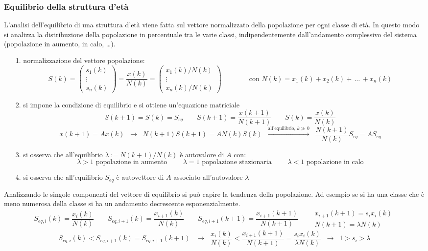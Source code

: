 \subsubsection*{Equilibrio della struttura d'età}
L'analisi dell'equilibrio di una struttura d'età viene fatta sul vettore normalizzato della popolazione per ogni classe di età. In
questo modo si analizza la distribuzione della popolazione in percentuale tra le varie classi, indipendentemente dall'andamento
complessivo del sistema (popolazione in aumento, in calo, \dots).
\begin{itemize}
	\item[1.] normalizzazione del vettore popolazione:
	\[S(k) = \left(\begin{matrix}
		s_1(k) \\ \vdots \\ s_n(k)
	\end{matrix}\right) = \frac{x(k)}{N(k)} = \left(\begin{matrix}
		x_1(k)/N(k) \\ \vdots \\ x_n(k)/N(k)
	\end{matrix}\right) \qquad\qquad \text{con } N(k) = x_1(k) + x_2(k) + \!\,\dots\!\, + x_n(k)\]
	\item[2.] si impone la condizione di equilibrio e si ottiene un'equazione matriciale
	\[S(k+1) = S(k) = S_{eq} \qquad S(k+1) = \frac{x(k+1)}{N(k+1)} \qquad S(k) = \frac{x(k)}{N(k)}\]
	\[x(k+1) = Ax(k) \;\; \rightarrow \;\; N(k+1)S(k+1) = A N(k)S(k) \;\; \stackrel{\text{all'equilibrio, } k \gg 0}{\longrightarrow} \;\; \frac{N(k+1)}{N(k)} S_{eq} = A S_{eq}\]
	\item[3.] si osserva che all'equilibrio \(\lambda := N(k+1)/N(k)\) è autovalore di \(A\) con:
	\[\lambda > 1 \text{ popolazione in aumento } \qquad \lambda = 1 \text{ popolazione stazionaria } \qquad \lambda < 1 \text{ popolazione in calo}\]
	\item[4.] si osserva che all'equilibrio \(S_{eq}\) è autovettore di \(A\) associato all'autovalore \(\lambda\)
\end{itemize}
Analizzando le singole componenti del vettore di equilibrio si può capire la tendenza della popolazione. Ad esempio se si ha una
classe  che è meno numerosa della classe  si ha un andamento decrescente esponenzialmente.
\[S_{eq,i}(k) = \frac{x_i(k)}{N(k)} \qquad S_{eq,i+1}(k) = \frac{x_{i+1}(k)}{N(k)} \qquad S_{eq,i+1}(k+1) = \frac{x_{i+1}(k+1)}{N(k+1)} \qquad \begin{array}{l} x_{i+1}(k+1) = s_i x_i(k) \\[5pt] N(k+1) = \lambda N(k)\end{array}\]
\[S_{eq,i}(k) < S_{eq,i+1}(k) = S_{eq,i+1}(k+1) \;\;\ \rightarrow \;\; \frac{x_i(k)}{N(k)} < \frac{x_{i+1}(k+1)}{N(k+1)} = \frac{s_i x_i(k)}{\lambda N(k)} \;\; \rightarrow \;\; 1 > s_i > \lambda\]

